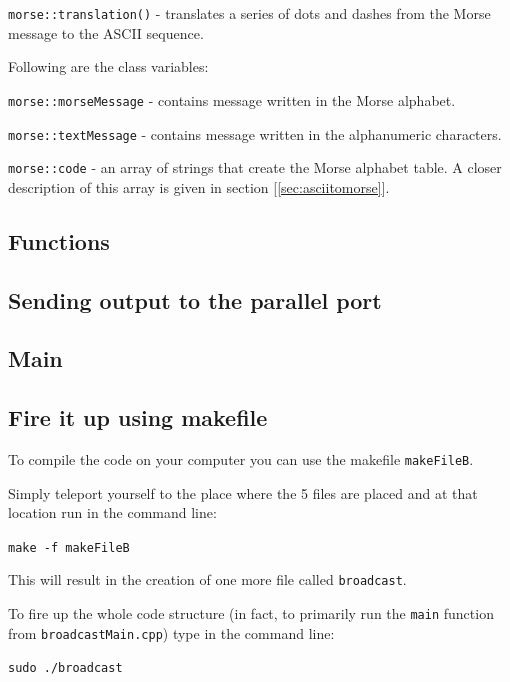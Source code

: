\documentclass[12pt]{report}
\begin{document}
\verb|morse::translation()| - translates a series of dots and dashes from the Morse message to the ASCII sequence.

Following are the class variables:

\verb|morse::morseMessage| - contains message written in the Morse alphabet.

\verb|morse::textMessage| - contains message written in the alphanumeric characters.

\verb|morse::code| - an array of strings that create the Morse alphabet table. A closer description of this array is given in section [\ref{sec:asciitomorse}].

\subsection{Functions}



\subsection{Sending output to the parallel port}



\subsection{Main}



\subsection{Fire it up using makefile}

To compile the code on your computer you can use the makefile \verb|makeFileB|.

Simply teleport yourself to the place where the 5 files are placed and at that location run in the command line:

\begin{snugshade}
\verb|make -f makeFileB|
\end{snugshade}

This will result in the creation of one more file called \verb|broadcast|.

To fire up the whole code structure (in fact, to primarily run the \verb|main| function from \verb|broadcastMain.cpp|) type in the command line:

\begin{snugshade}
\verb|sudo ./broadcast|
\end{snugshade}
\end{document}
